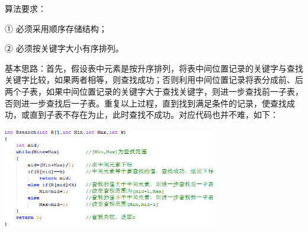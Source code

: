 {{算法要求：}}

{① 必须采用顺序存储结构；}

{② 必须按关键字大小有序排列。}

{{基本思路：}首先，假设表中元素是按升序排列，将表中间位置记录的关键字与查找关键字比较，如果两者相等，则查找成功；否则利用中间位置记录将表分成前、后两个子表，如果中间位置记录的关键字大于查找关键字，则进一步查找前一子表，否则进一步查找后一子表。重复以上过程，直到找到满足条件的记录，使查找成功，或直到子表不存在为止，此时查找不成功。对应代码也并不难，如下：}

\includegraphics[width=3.70833in,height=1.72917in]{png-jpeg-pics/528BA045C8243E9DF3749442524992A9.png}
